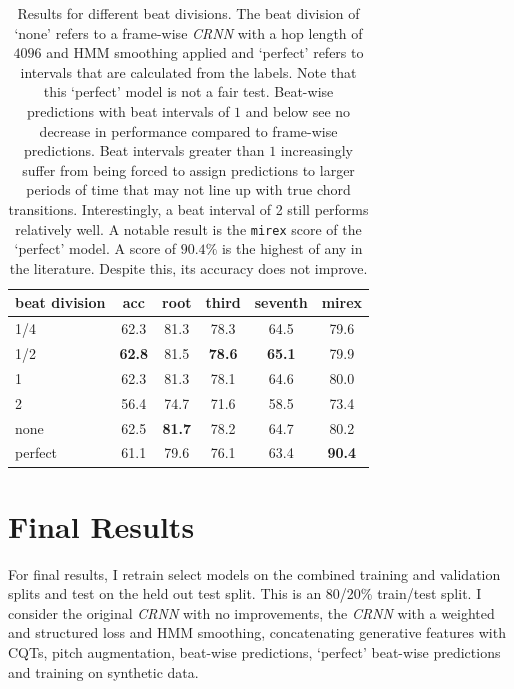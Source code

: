 \begin{table}[H]
    \centering
    \begin{tabular}{lccccc}
        \toprule
        beat division & acc & root & third & seventh & mirex \\  
        \midrule
        1/4                 & 62.3           & 81.3          & 78.3          & 64.5           & 79.6         \\
        1/2                 & \textbf{62.8}  & 81.5          & \textbf{78.6} & \textbf{65.1}  & 79.9         \\
        1                   & 62.3           & 81.3          & 78.1          & 64.6           & 80.0         \\
        2                   & 56.4           & 74.7          & 71.6          & 58.5           & 73.4         \\
        none                & 62.5           & \textbf{81.7} & 78.2          & 64.7           & 80.2         \\
        perfect             & 61.1           & 79.6          & 76.1          & 63.4           & \textbf{90.4}\\
        \bottomrule
    \end{tabular}
    \caption{Results for different beat divisions. The beat division of `none' refers to a frame-wise \emph{CRNN} with a hop length of $4096$ and HMM smoothing applied and `perfect' refers to intervals that are calculated from the labels. Note that this `perfect' model is not a fair test. Beat-wise predictions with beat intervals of $1$ and below see no decrease in performance compared to frame-wise predictions. Beat intervals greater than $1$ increasingly suffer from being forced to assign predictions to larger periods of time that may not line up with true chord transitions. Interestingly, a beat interval of 2 still performs relatively well. A notable result is the \texttt{mirex} score of the `perfect' model. A score of $90.4\%$ is the highest of any in the literature. Despite this, its accuracy does not improve. }\label{tab:beat_division}
\end{table}


\section{Final Results}\label{sec:test-set}

For final results, I retrain select models on the combined training and validation splits and test on the held out test split. This is an 80/20\% train/test split. I consider the original \emph{CRNN} with no improvements, the \emph{CRNN} with a weighted and structured loss and HMM smoothing, concatenating generative features with CQTs, pitch augmentation, beat-wise predictions, `perfect' beat-wise predictions and training on synthetic data. 

